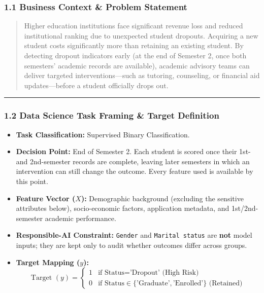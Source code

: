 \documentclass[11pt]{article}
\begin{document}
\hypertarget{business-context-problem-statement}{%
\subsubsection{1.1 Business Context \& Problem
Statement}\label{business-context-problem-statement}}

\begin{quote}
Higher education institutions face significant revenue loss and reduced
institutional ranking due to unexpected student dropouts. Acquiring a
new student costs significantly more than retaining an existing student.
By detecting dropout indicators early (at the end of Semester 2, once
both semesters' academic records are available), academic advisory teams
can deliver targeted interventions---such as tutoring, counseling, or
financial aid updates---before a student officially drops out.
\end{quote}

\begin{center}\rule{0.5\linewidth}{0.5pt}\end{center}

\hypertarget{data-science-task-framing-target-definition}{%
\subsubsection{1.2 Data Science Task Framing \& Target
Definition}\label{data-science-task-framing-target-definition}}

\begin{itemize}
\item
  \textbf{Task Classification:} Supervised Binary Classification.
\item
  \textbf{Decision Point:} End of Semester 2. Each student is scored
  once their 1st- and 2nd-semester records are complete, leaving later
  semesters in which an intervention can still change the outcome. Every
  feature used is available by this point.
\item
  \textbf{Feature Vector (\(X\)):} Demographic background (excluding the
  sensitive attributes below), socio-economic factors, application
  metadata, and 1st/2nd-semester academic performance.
\item
  \textbf{Responsible-AI Constraint:} \texttt{Gender} and
  \texttt{Marital\ status} are \textbf{not} model inputs; they are kept
  only to audit whether outcomes differ across groups.
\item
  \textbf{Target Mapping (\(y\)):}
  \[\text{Target } (y) = \begin{cases} 1 & \text{if Status} = \text{'Dropout' (High Risk)} \\ 0 & \text{if Status} \in \{\text{'Graduate'}, \text{'Enrolled'}\} \text{ (Retained)} \end{cases}\]
\end{itemize}
\end{document}
